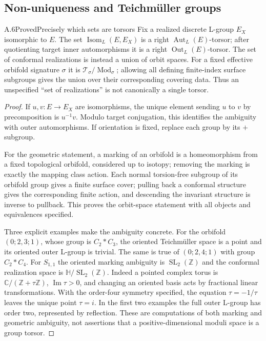 \subsection{Non-uniqueness and Teichm\"uller groups}

\begin{statement}{A.6}{Proved}{Precisely which sets are torsors}
Fix a realized discrete L-group $E_X$ isomorphic to $E$. The set
$\operatorname{Isom}_L(E,E_X)$ is a right
$\operatorname{Aut}_L(E)$-torsor; after quotienting target inner
automorphisms it is a right $\operatorname{Out}_L(E)$-torsor.
The set of conformal realizations is instead a union of orbit spaces.
For a fixed effective orbifold signature $\sigma$ it is
$\mathcal T_\sigma/\operatorname{Mod}_\sigma$; allowing all defining
finite-index surface subgroups gives the union over their corresponding
covering data. Thus an unspecified ``set of realizations'' is not
canonically a single torsor.
\end{statement}
\begin{proof}
If $u,v:E\to E_X$ are isomorphisms, the unique element sending
$u$ to $v$ by precomposition is $u^{-1}v$. Modulo target conjugation,
this identifies the ambiguity with outer automorphisms. If orientation
is fixed, replace each group by its $+$ subgroup.

For the geometric statement, a marking of an orbifold is a
homeomorphism from a fixed topological orbifold, considered up to
isotopy; removing the marking is exactly the mapping class action.
Each normal torsion-free subgroup of its orbifold group gives a
finite surface cover; pulling back a conformal structure gives the
corresponding finite action, and descending the invariant structure
is inverse to pullback. This proves the orbit-space statement with
all objects and equivalences specified.

Three explicit examples make the ambiguity concrete. For the
orbifold $(0;2,3;1)$, whose group is $C_2*C_3$, the oriented
Teichm\"uller space is a point and its oriented outer L-group is
trivial. The same is true of $(0;2,4;1)$ with group $C_2*C_4$.
For $S_{1,1}$ the oriented marking ambiguity is
$\operatorname{SL}_2(\mathbb Z)$ and the conformal realization space
is $\mathbb H/\operatorname{SL}_2(\mathbb Z)$. Indeed a pointed
complex torus is $\mathbb C/(\mathbb Z+\tau\mathbb Z)$,
$\operatorname{Im}\tau>0$, and changing an oriented basis acts
by fractional linear transformations. With the order-four symmetry
specified, the equation $\tau=-1/\tau$ leaves the unique point
$\tau=i$. In the first two examples the full outer L-group has
order two, represented by reflection. These are computations of
both marking and geometric ambiguity, not assertions that a
positive-dimensional moduli space is a group torsor.
\end{proof}

